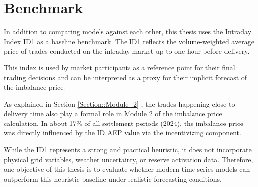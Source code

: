 \documentclass[class=scrbook, crop=false]{standalone}
\begin{document}
\section{Benchmark}
\label{Section:Benchmark}

In addition to comparing models against each other, this thesis uses the Intraday Index ID1 as a baseline benchmark. The ID1 reflects the volume-weighted average price of trades conducted on the intraday market up to one hour before delivery.

This index is used by market participants as a reference point for their final trading decisions and can be interpreted as a proxy for their implicit forecast of the imbalance price.

As explained in Section \ref{Section::Module_2} , the trades happening close to delivery time also play a formal role in Module 2 of the imbalance price calculation. In about 17\% of all settlement periods (2024), the imbalance price was directly influenced by the ID AEP value via the incentivizing component.

While the ID1 represents a strong and practical heuristic, it does not incorporate physical grid variables, weather uncertainty, or reserve activation data. Therefore, one objective of this thesis is to evaluate whether modern time series models can outperform this heuristic baseline under realistic forecasting conditions.




\end{document}
